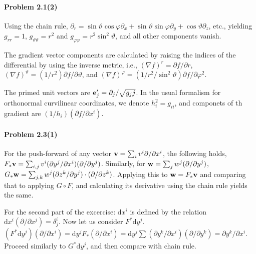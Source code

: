 \documentclass[a4paper,12pt]{article}
\def\d{\mathrm{d}}
\newcommand{\problem}[1]{\paragraph{Problem #1}}
\begin{document}

\problem{2.1(2)} Using the chain rule, $\partial_r = \sin\vartheta\cos\varphi \partial_x + \sin\vartheta\sin\varphi \partial_y + \cos\vartheta \partial_z$, etc., yielding $g_{rr} = 1$, $g_{\vartheta\vartheta} = r^2$ and $g_{\varphi\varphi} = r^2 \sin^2\vartheta$, and all other components vanish.

The gradient vector components are calculated by raising the indices of the differential by using the inverse metric, i.e., $(\nabla f)^r = \partial f / \partial r$, $(\nabla f)^\vartheta = (1/r^2) \partial f/\partial \vartheta$, and $(\nabla f)^\varphi = (1/r^2/\sin^2\vartheta) \partial f/\partial\varphi^2$.

The primed unit vectors are ${\bf e}_j' = \partial_j / \sqrt{g_jj}$. In the usual formalism for orthonormal curvilinear coordinates, we denote $h_i^2 = g_{ii}$, and componets of th gradient are $(1/h_i)(\partial f/\partial x^i)$.


\problem{2.3(1)} For the push-forward of any vector ${\bf v} = \sum_i v^i \partial/\partial x^i$, the following holds, $F_*{\bf v} = \sum_{i,j} v^i (\partial y^j/\partial x^i)(\partial / \partial y^j)$. Similarly, for ${\bf w} = \sum_j w^j (\partial/\partial y^j)$, $G_*{\bf w} = \sum_{j,k} w^j (\partial z^k/\partial y^j)\cdot (\partial / \partial z^k)$. Applying this to ${\bf w} = F_*{\bf v}$ and comparing that to applying $G\circ F$, and calculating its derivative using the chain rule yields the same.

For the second part of the excercise: $\d x^i$ is defined by the relation $\d x^i (\partial/\partial x^j) = \delta^i_j$. Now let us consider $F^* \d y^j$. $(F^* \d y^j) (\partial/\partial x^i) = \d y^j F_* (\partial /\partial x^i) = \d y^j \sum (\partial y^k/\partial x^i) (\partial/\partial y^k) = \partial y^k/\partial x^i$. Proceed similarly to $G^* \d y^j$, and then compare with chain rule.

\end{document}
